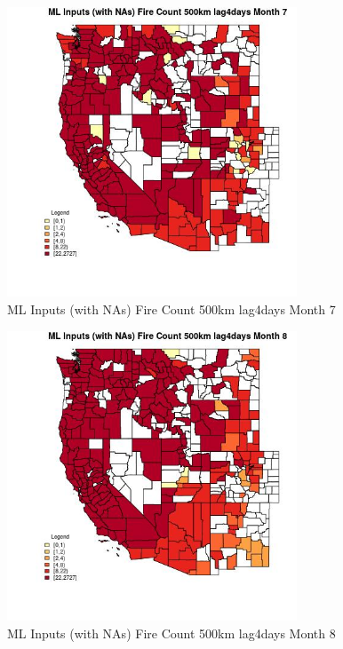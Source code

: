 \begin{figure} 
\centering  
\includegraphics[width=0.77\textwidth]{Code_Outputs/Report_ML_input_PM25_Step4_part_f_de_duplicated_aves_prioritize_24hr_obswNAs_CountyFire_Count_500km_lag4daysmedianMonth7.jpg} 
\caption{\label{fig:Report_ML_input_PM25_Step4_part_f_de_duplicated_aves_prioritize_24hr_obswNAsCountyFire_Count_500km_lag4daysmedianMonth7}ML Inputs (with NAs) Fire Count 500km lag4days Month 7} 
\end{figure} 
 

\begin{figure} 
\centering  
\includegraphics[width=0.77\textwidth]{Code_Outputs/Report_ML_input_PM25_Step4_part_f_de_duplicated_aves_prioritize_24hr_obswNAs_CountyFire_Count_500km_lag4daysmedianMonth8.jpg} 
\caption{\label{fig:Report_ML_input_PM25_Step4_part_f_de_duplicated_aves_prioritize_24hr_obswNAsCountyFire_Count_500km_lag4daysmedianMonth8}ML Inputs (with NAs) Fire Count 500km lag4days Month 8} 
\end{figure} 
 

